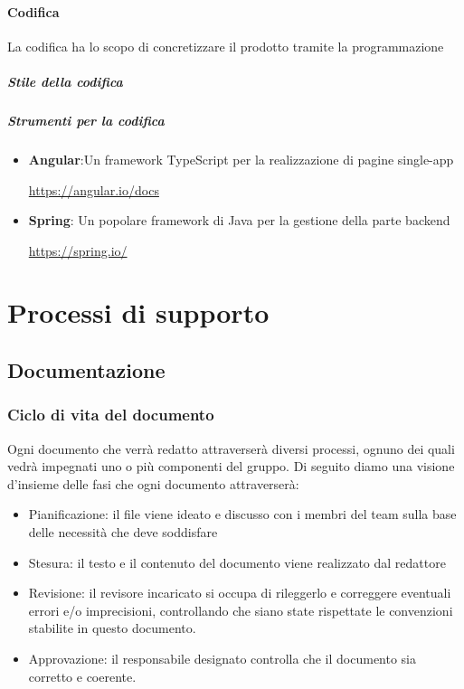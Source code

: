 \documentclass[12pt]{article}
\begin{document}
\paragraph{Codifica}
La codifica ha lo scopo di concretizzare il prodotto tramite la programmazione

\subparagraph{Stile della codifica}

\subparagraph{Strumenti per la codifica}
\begin{itemize}
    \item \textbf{Angular}:Un framework TypeScript per la realizzazione di pagine single-app\\ 
    \begin{center}
        \url{https://angular.io/docs}
    \end{center}
    \item \textbf{Spring}: Un popolare framework di Java per la gestione della parte backend 
    \begin{center}
        \url{https://spring.io/}
    \end{center}
\end{itemize}
\section{Processi di supporto}

\subsection{Documentazione}
\subsubsection{Ciclo di vita del documento}
Ogni documento che verrà redatto attraverserà diversi processi, ognuno dei quali vedrà impegnati uno o più componenti del gruppo.
Di seguito diamo una visione d'insieme delle fasi che ogni documento attraverserà:
\begin{itemize}
    \item Pianificazione: il file viene ideato e discusso con i membri del team sulla base delle necessità che deve soddisfare
    \item Stesura: il testo e il contenuto del documento viene realizzato dal redattore
    \item Revisione: il revisore incaricato si occupa di rileggerlo e correggere eventuali errori e/o imprecisioni, controllando che siano state rispettate le convenzioni stabilite in questo documento.
    \item Approvazione: il responsabile designato controlla che il documento sia corretto e coerente.
\end{itemize}
\end{document}
